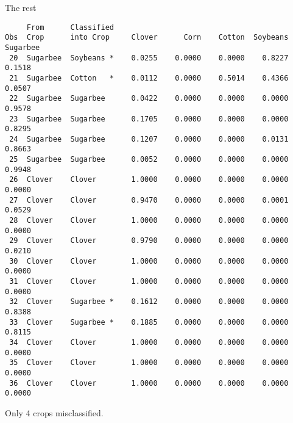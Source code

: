 \documentclass[pdf]{prosper}
\begin{document}
\begin{slide}{The rest}

{\scriptsize
\begin{verbatim}
     From      Classified
Obs  Crop      into Crop     Clover      Corn    Cotton  Soybeans  Sugarbee
 20  Sugarbee  Soybeans *    0.0255    0.0000    0.0000    0.8227    0.1518
 21  Sugarbee  Cotton   *    0.0112    0.0000    0.5014    0.4366    0.0507
 22  Sugarbee  Sugarbee      0.0422    0.0000    0.0000    0.0000    0.9578
 23  Sugarbee  Sugarbee      0.1705    0.0000    0.0000    0.0000    0.8295
 24  Sugarbee  Sugarbee      0.1207    0.0000    0.0000    0.0131    0.8663
 25  Sugarbee  Sugarbee      0.0052    0.0000    0.0000    0.0000    0.9948
 26  Clover    Clover        1.0000    0.0000    0.0000    0.0000    0.0000
 27  Clover    Clover        0.9470    0.0000    0.0000    0.0001    0.0529
 28  Clover    Clover        1.0000    0.0000    0.0000    0.0000    0.0000
 29  Clover    Clover        0.9790    0.0000    0.0000    0.0000    0.0210
 30  Clover    Clover        1.0000    0.0000    0.0000    0.0000    0.0000
 31  Clover    Clover        1.0000    0.0000    0.0000    0.0000    0.0000
 32  Clover    Sugarbee *    0.1612    0.0000    0.0000    0.0000    0.8388
 33  Clover    Sugarbee *    0.1885    0.0000    0.0000    0.0000    0.8115
 34  Clover    Clover        1.0000    0.0000    0.0000    0.0000    0.0000
 35  Clover    Clover        1.0000    0.0000    0.0000    0.0000    0.0000
 36  Clover    Clover        1.0000    0.0000    0.0000    0.0000    0.0000

\end{verbatim}
}
Only 4 crops misclassified.

\end{slide}
\end{document}
